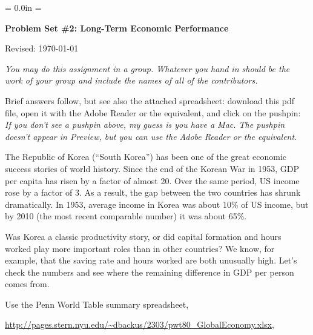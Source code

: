 \documentclass[12pt]{exam}
\def\HeadName{Problem Set \#2}
\begin{document}
\parindent = 0.0in
\parskip = \bigskipamount
\thispagestyle{empty}%
\Head

\centerline{\large \bf \HeadName: Long-Term Economic Performance}
\centerline{Revised:  \today}

\medskip
{\it You may do this assignment in a group.
Whatever you hand in should be the work of your group
and include the names of all of the contributors.}

\begin{questions}

\begin{solution}
Brief answers follow,
but see also the attached spreadsheet:
download this pdf file, open it with the Adobe Reader or the equivalent,
and click on the pushpin:
 \\
{\it If you don't see a pushpin above, my guess is you have a Mac.
The pushpin doesn't appear in Preview,
but you can use the Adobe Reader or the equivalent.}
\end{solution}

The Republic of Korea (``South Korea'')
has been one of the great economic success stories of world history.
Since the end of the Korean War in 1953,
GDP per capita has risen by a factor of almost 20.
Over the same period, US income rose by a factor of 3.
As a result, the gap between the two countries has shrunk dramatically.
In 1953, average income in Korea was about 10\% of US income,
but by 2010 (the most recent comparable number) it was about 65\%.

Was Korea a classic productivity story,
or did capital formation and hours worked play more important
roles than in other countries?
We know, for example, that the saving rate and hours worked
are both unusually high.
Let's check the numbers and see where the remaining difference
in GDP per person comes from.

Use the Penn World Table summary spreadsheet,

\vspace*{\parskip}
\centerline{\url{http://pages.stern.nyu.edu/~dbackus/2303/pwt80_GlobalEconomy.xlsx},}


\end{questions}
\end{document}
